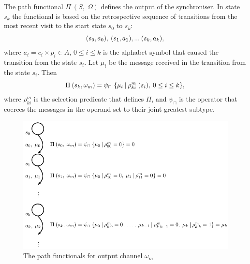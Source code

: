 The path functional $\Pi \: (S, \; \Omega)$ defines the output of the synchroniser. In state $s_k$ the functional is based on the retrospective sequence of transitions from the most recent visit to the start state $s_{0}$ to $s_{k}$:
\begin{equation}
(s_{0}, a_{0}), \: (s_{1}, a_{1}),... \: (s_{k}, a_{k}),\\\nonumber
\end{equation}
where $a_i = c_i \times p_i \in A$, $0 \le i \le k$ is the alphabet symbol that caused the transition from the state $s_{i}$. Let $\mu_{i}$ be the message received in the transition from the state $s_{i}$. Then
\begin{equation}
\Pi \: (s_{k}, \omega_{m}) = \psi_{\sqcap} \; \{\mu_{i} \: | \: \rho_{ki}^{m} \; (s_{i}), \: 0 \le i \le k\},\\\label{predic}
\end{equation}
where $\rho_{ki}^{m}$ is the selection predicate that defines $\Pi$, and $\psi_{\sqcap}$ is the operator that coerces the messages in the operand set to their joint greatest subtype.

  \begin{figure}[here]
  \centering
  \includegraphics[scale=0.8]{figs/chapter_02_math_exec.pdf}
  \caption{The path functionals for output channel $\omega_m$}
  \label{fig:math_exec}
  \end{figure}

